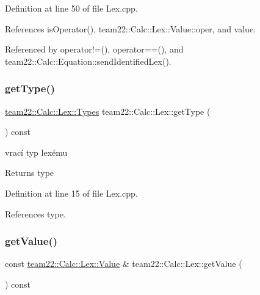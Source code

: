 Definition at line 50 of file Lex.\+cpp.



References is\+Operator(), team22\+::\+Calc\+::\+Lex\+::\+Value\+::oper, and value.



Referenced by operator!=(), operator==(), and team22\+::\+Calc\+::\+Equation\+::send\+Identified\+Lex().

\mbox{\label{classteam22_1_1_calc_1_1_lex_ae82ccde78beed14c45df1e747ed21bcb}} 
\subsubsection{\texorpdfstring{get\+Type()}{getType()}}
{\footnotesize\ttfamily \hyperlink{classteam22_1_1_calc_1_1_lex_a295984577c98a23ddd20ee36d33145a2}{team22\+::\+Calc\+::\+Lex\+::\+Types} team22\+::\+Calc\+::\+Lex\+::get\+Type (\begin{DoxyParamCaption}{ }\end{DoxyParamCaption}) const}



vrací typ lexému 

\begin{DoxyReturn}{Returns}
type 
\end{DoxyReturn}


Definition at line 15 of file Lex.\+cpp.



References type.

\mbox{\label{classteam22_1_1_calc_1_1_lex_a8a68cd13a68d32d50d3b014ca4478fab}} 
\subsubsection{\texorpdfstring{get\+Value()}{getValue()}}
{\footnotesize\ttfamily const \hyperlink{unionteam22_1_1_calc_1_1_lex_1_1_value}{team22\+::\+Calc\+::\+Lex\+::\+Value} \& team22\+::\+Calc\+::\+Lex\+::get\+Value (\begin{DoxyParamCaption}{ }\end{DoxyParamCaption}) const}



